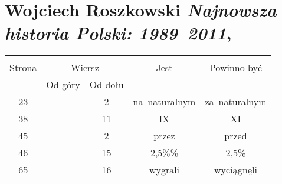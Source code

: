 \documentclass[a4paper,11pt]{article}
\numberwithin{equation}{section}
\begin{document}
\VerSpaceTwo











\section{Wojciech Roszkowski \textit{Najnowsza historia
    Polski: 1989--2011},
  \cite{RoszkowskiNajnowszaHistoriaPolski1989-2011Wyd2011} }






\begin{center}

  \begin{tabular}{|c|c|c|c|c|}
    \hline
    & \multicolumn{2}{c|}{} & & \\
    Strona & \multicolumn{2}{c|}{Wiersz} & Jest
                              & Powinno być \\ \cline{2-3}
    & Od góry & Od dołu & & \\
    \hline
    23 & &  2 & na~naturalnym & za~naturalnym \\
    38 & & 11 & IX & XI \\
    45 & &  2 & przez & przed \\
    46 & & 15 & 2,5\%\% & 2,5\% \\
    65 & & 16 & wygrali & wyciągnęli \\
    \hline
  \end{tabular}

\end{center}


\VerSpaceTwo










\end{document}

